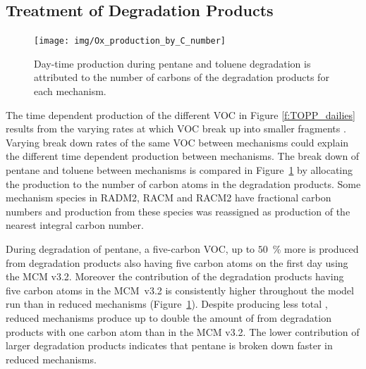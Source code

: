 \subsection{Treatment of Degradation Products} \label{ss:products} 
%
\begin{figure}
    \centering
    \texttt{[image: img/Ox\_production\_by\_C\_number]}
    \vspace{0mm}
    \caption{Day-time  production during pentane and toluene degradation is attributed to the number of carbons of the degradation products for each mechanism.}
    \vspace{-4mm}
    \label{f:carbon}
\end{figure}
%
The time dependent  production of the different VOC in Figure \ref{f:TOPP_dailies} results from the varying rates at which VOC break up into smaller fragments \citep{Butler:2011}.
Varying break down rates of the same VOC between mechanisms could explain the different time dependent  production between mechanisms.
The break down of pentane and toluene between mechanisms is compared in \mbox{Figure \ref{f:carbon}} by allocating the  production to the number of carbon atoms in the degradation products.
Some mechanism species in RADM2, RACM and RACM2 have fractional carbon numbers \citep{Stockwell:1990, Stockwell:1997, Goliff:2013} and  production from these species was reassigned as  production of the nearest integral carbon number.  

During degradation of pentane, a five-carbon VOC, up to \mbox{$50$ \%} more  is produced from degradation products also having five carbon atoms on the first day using the MCM v3.2. 
Moreover the contribution of the degradation products having five carbon atoms in the \mbox{MCM v3.2} is consistently higher throughout the model run than in reduced mechanisms \mbox{(Figure \ref{f:carbon}).}
Despite producing less total , reduced mechanisms produce up to double the amount of  from degradation products with one carbon atom than in the MCM v3.2.
The lower contribution of larger degradation products indicates that pentane is broken down faster in reduced mechanisms.

